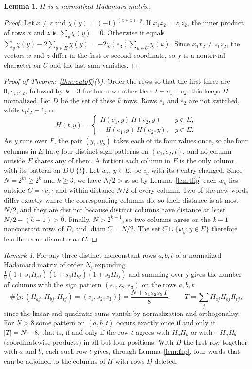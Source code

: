 \documentclass[11pt]{amsart}
\newtheorem{lemma}[theorem]{Lemma}
\theoremstyle{remark}
\newtheorem{remark}[theorem]{Remark}
\DeclareMathOperator{\diam}{diam}
\begin{document}
\begin{lemma}\label{lem:hadamard}
$H$ is a normalized Hadamard matrix.
\end{lemma}

\begin{proof}
Let $x\ne z$ and $\chi(y)=(-1)^{(x+z)\cdot y}$. If $x_1x_2=z_1z_2$, the inner product of rows $x$ and $z$ is
$\sum_y\chi(y)=0$. Otherwise it equals $\sum_y\chi(y)-2\sum_{y\in E}\chi(y)=-2\chi(e_3)\sum_{u\in U}\chi(u)$. Since
$x_1x_2\ne z_1z_2$, the vectors $x$ and $z$ differ in the first or second coordinate, so $\chi$ is a nontrivial
character on $U$ and the last sum vanishes.
\end{proof}

\begin{proof}[Proof of Theorem~\ref{thm:cutoff}(b)]
Order the rows so that the first three are $0,e_1,e_2$, followed by $k-3$ further rows other than $t=e_1+e_2$; this
keeps $H$ normalized. Let $D$ be the set of these $k$ rows. Rows $e_1$ and $e_2$ are not switched, while $t_1t_2=1$, so
\[
H(t,y)=\begin{cases}H(e_1,y)\,H(e_2,y), & y\notin E,\\ -H(e_1,y)\,H(e_2,y), & y\in E.\end{cases}
\]
As $y$ runs over $E$, the pair $(y_1,y_2)$ takes each of its four values once, so the four columns in $E$ have four
distinct sign patterns on $(e_1,e_2,t)$, and no column outside $E$ shares any of them. A fortiori each column in $E$ is
the only column with its pattern on $D\cup\{t\}$. Let $w_y$, $y\in E$, be $c_y$ with its $t$-entry changed. Since
$N=2^m\ge2^k$ and $k\ge3$, we have $N/2>k$, so by Lemma~\ref{lem:flip} each $w_y$ lies outside $C=\{c_j\}$ and within
distance $N/2$ of every column. Two of the new words differ exactly where the corresponding columns do, so their
distance is at most $N/2$, and they are distinct because distinct columns have distance at least $N/2-(k-1)>0$.
Finally, $N>2^{k-1}$, so two columns agree on the $k-1$ nonconstant rows of $D$, and $\diam C=N/2$. The set
$C\cup\{w_y:y\in E\}$ therefore has the same diameter as $C$.
\end{proof}

\begin{remark}
For any three distinct nonconstant rows $a,b,t$ of a normalized Hadamard matrix of order $N$, expanding
$\frac18(1+s_1H_{aj})(1+s_2H_{bj})(1+s_3H_{tj})$ and summing over $j$ gives the number of columns with the sign pattern
$(s_1,s_2,s_3)$ on the rows $a,b,t$:
\[
\#\{j: (H_{aj},H_{bj},H_{tj})=(s_1,s_2,s_3)\}=\frac{N+s_1s_2s_3\,T}{8},\qquad T=\sum_jH_{aj}H_{bj}H_{tj},
\]
since the linear and quadratic sums vanish by normalization and orthogonality. For $N>8$ some pattern on $(a,b,t)$
occurs exactly once if and only if $|T|=N-8$, that is, if and only if the row $t$ agrees with $H_aH_b$ or with $-H_aH_b$
(coordinatewise products) in all but four positions. With $D$ the first row together with $a$ and $b$, each such row
$t$ gives, through Lemma~\ref{lem:flip}, four words that can be adjoined to the columns of $H$ with rows $D$ deleted.
\end{remark}
\end{document}

